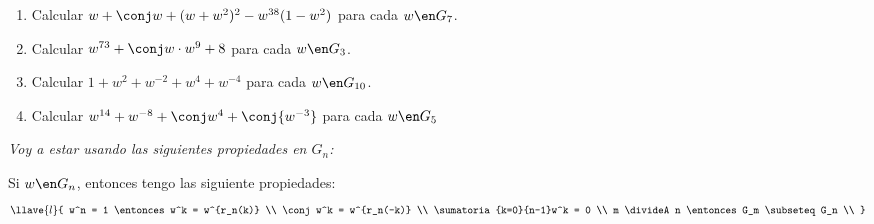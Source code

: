 \begin{enunciado}{\ejercicio}
  \begin{enumerate}[label=\alph*)]
    \item Calcular $w + \conj w + (w + w^2)^2 - w^{38}(1 - w^2)$ para cada $w \en G_7$.
    \item Calcular $w^{73} + \conj w \cdot w^9 + 8$ para cada $w\en G_3$.
    \item Calcular $1 + w^2 + w^{-2} + w^4 + w^{-4}$ para cada $w\en G_{10}$.
    \item Calcular $w^{14} + w^{-8} + \conj w^4 + \conj{w^{-3}}$ para cada $w \en G_5$
  \end{enumerate}
\end{enunciado}

\textit{Voy a estar usando las siguientes propiedades en $G_n$: }

Si $w \en G_n$, entonces tengo las siguiente propiedades:
$$
  \llave{l}{
    w^n = 1 \entonces w^k = w^{r_n(k)}                                                                         \\
    \conj w^k = w^{r_n(-k)}                                                                                    \\
    \sumatoria{k=0}{n-1}w^k = 0                                                                                \\
    m \divideA n \entonces G_m \subseteq G_n \\
  }
$$

